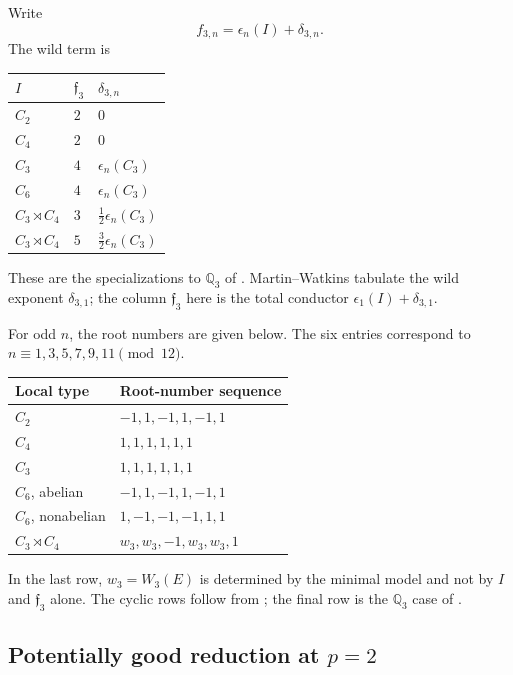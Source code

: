 \documentclass[11pt,reqno]{amsart}
\theoremstyle{definition}
\theoremstyle{remark}
\newcommand{\Q}{\mathbb Q}
\begin{document}
Write
\begin{equation*}
 f_{3,n}=\epsilon_n(I)+\delta_{3,n}.
\end{equation*}
The wild term is
\begin{center}
\begin{tabular}{@{}lll@{}}
\toprule
$I$ & $\mathfrak f_3$ & $\delta_{3,n}$ \\
\midrule
$C_2$ & $2$ & $0$ \\
$C_4$ & $2$ & $0$ \\
$C_3$ & $4$ & $\epsilon_n(C_3)$ \\
$C_6$ & $4$ & $\epsilon_n(C_3)$ \\
$C_3\rtimes C_4$ & $3$ & $\tfrac12\epsilon_n(C_3)$ \\
$C_3\rtimes C_4$ & $5$ & $\tfrac32\epsilon_n(C_3)$ \\
\bottomrule
\end{tabular}
\end{center}
These are the specializations to $\Q_3$ of
\cite[Tables~2 and 3]{MartinWatkins}.  Martin--Watkins tabulate the wild
exponent $\delta_{3,1}$; the column $\mathfrak f_3$ here is the total
conductor $\epsilon_1(I)+\delta_{3,1}$.

For odd $n$, the root numbers are given below.  The six entries correspond to
$n\equiv1,3,5,7,9,11\pmod{12}$.
\begin{center}
\begin{tabular}{@{}ll@{}}
\toprule
Local type & Root-number sequence \\
\midrule
$C_2$ & $-1,1,-1,1,-1,1$ \\
$C_4$ & $1,1,1,1,1,1$ \\
$C_3$ & $1,1,1,1,1,1$ \\
$C_6$, abelian & $-1,1,-1,1,-1,1$ \\
$C_6$, nonabelian & $1,-1,-1,-1,1,1$ \\
$C_3\rtimes C_4$ & $w_3,w_3,-1,w_3,w_3,1$ \\
\bottomrule
\end{tabular}
\end{center}
In the last row, $w_3=W_3(E)$ is determined by the minimal model and not by
$I$ and $\mathfrak f_3$ alone.
The cyclic rows follow from \cite[Propositions~5.1 and 6.1]{DMW}; the final
row is the $\Q_3$ case of \cite[Section~11]{DMW}.

\subsection{Potentially good reduction at \texorpdfstring{$p=2$}{p=2}}
\end{document}
